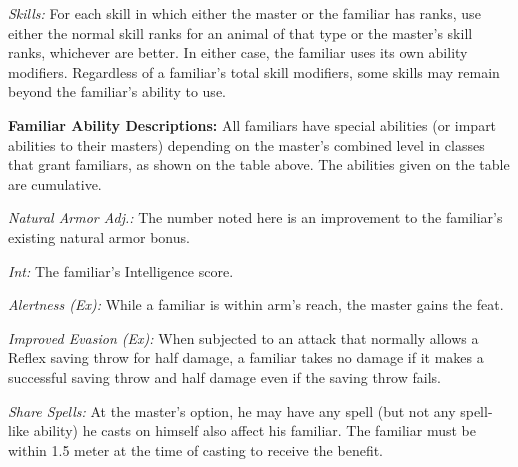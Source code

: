 \textit{Skills:} For each skill in which either the master or the familiar has ranks, use either the normal skill ranks for an animal of that type or the master's skill ranks, whichever are better. In either case, the familiar uses its own ability modifiers. Regardless of a familiar's total skill modifiers, some skills may remain beyond the familiar's ability to use.


\textbf{Familiar Ability Descriptions:} All familiars have special abilities (or impart abilities to their masters) depending on the master's combined level in classes that grant familiars, as shown on the table above. The abilities given on the table are cumulative.

\textit{Natural Armor Adj.:} The number noted here is an improvement to the familiar's existing natural armor bonus.

\textit{Int:} The familiar's Intelligence score.

\textit{Alertness (Ex):} While a familiar is within arm's reach, the master gains the  feat.

\textit{Improved Evasion (Ex):} When subjected to an attack that normally allows a Reflex saving throw for half damage, a familiar takes no damage if it makes a successful saving throw and half damage even if the saving throw fails.

\textit{Share Spells:} At the master's option, he may have any spell (but not any spell-like ability) he casts on himself also affect his familiar. The familiar must be within 1.5 meter at the time of casting to receive the benefit.


